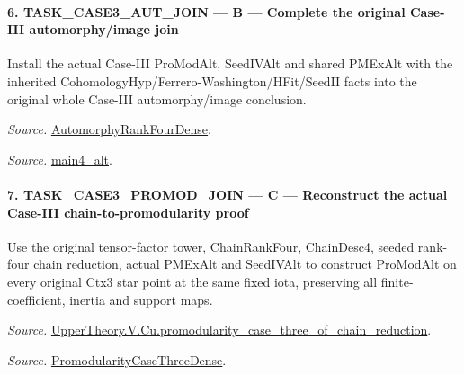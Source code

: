 \paragraph{6. TASK\_\allowbreak CASE3\_\allowbreak AUT\_\allowbreak JOIN — B — Complete the original Case-III automorphy/image join}

Install the actual Case-III ProModAlt, SeedIVAlt and shared PMExAlt with the inherited CohomologyHyp/Ferrero-Washington/HFit/SeedII facts into the original whole Case-III automorphy/image conclusion.

\emph{Source.} \href{https://github.com/CocoSgt/riemann-hypothesis-lean/blob/7cbf7a0c32fca1badf05931879a37c3f8a2b03b4/src/Development/AutomorphicArithmetic/AutomorphicVarieties/ModularityArgument/ThresholdArguments/DenseThresholdCases/PromodularityCaseThree.lean#L43-L44}{AutomorphyRankFourDense}.

\emph{Source.} \href{https://github.com/CocoSgt/riemann-hypothesis-lean/blob/7cbf7a0c32fca1badf05931879a37c3f8a2b03b4/src/Development/AutomorphicArithmetic/AutomorphicVarieties/ModularityArgument/ThresholdArguments/DenseThresholdCases/CuFinal.lean#L44-L44}{main4\_\allowbreak alt}.



\paragraph{7. TASK\_\allowbreak CASE3\_\allowbreak PROMOD\_\allowbreak JOIN — C — Reconstruct the actual Case-III chain-to-promodularity proof}

Use the original tensor-factor tower, ChainRankFour, ChainDesc4, seeded rank-four chain reduction, actual PMExAlt and SeedIVAlt to construct ProModAlt on every original Ctx3 star point at the same fixed iota, preserving all finite-coefficient, inertia and support maps.

\emph{Source.} \href{https://github.com/CocoSgt/riemann-hypothesis-lean/blob/7cbf7a0c32fca1badf05931879a37c3f8a2b03b4/src/Development/AutomorphicArithmetic/AutomorphicVarieties/ModularityArgument/ThresholdArguments/DenseThresholdCases/PromodularityCaseThreeOfLemmas.lean#L131-L153}{UpperTheory.V.Cu.promodularity\_\allowbreak case\_\allowbreak three\_\allowbreak of\_\allowbreak chain\_\allowbreak reduction}.

\emph{Source.} \href{https://github.com/CocoSgt/riemann-hypothesis-lean/blob/7cbf7a0c32fca1badf05931879a37c3f8a2b03b4/src/Development/AutomorphicArithmetic/AutomorphicVarieties/ModularityArgument/ThresholdArguments/DenseThresholdCases/PromodularityCaseThree.lean#L40-L42}{PromodularityCaseThreeDense}.



